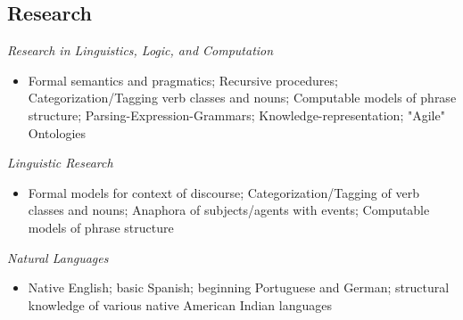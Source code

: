 \documentclass[margin,line]{resume}
\begin{document}
\begin{resume}
\section{Research}
{\sl Research in Linguistics, Logic, and Computation}
       \begin{itemize}
        \item[]  Formal semantics and pragmatics; Recursive procedures; Categorization/Tagging verb classes and nouns; Computable models of phrase structure; Parsing-Expression-Grammars; Knowledge-representation; "Agile" Ontologies
    \end{itemize}
{\sl Linguistic Research}
    \begin{itemize} %
     \item[] Formal models for context of discourse; Categorization/Tagging of verb classes and nouns; Anaphora of subjects/agents with events; Computable models of phrase structure
      \end{itemize}
{\sl Natural Languages}
        \begin{itemize}
         \item[] Native English; basic Spanish; beginning Portuguese and German;
           structural knowledge of various native American Indian languages
     \end{itemize}


\end{resume}
\end{document}
